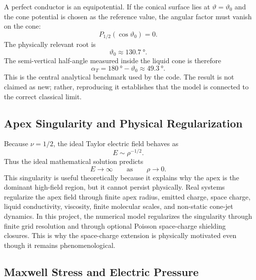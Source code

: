 A perfect conductor is an equipotential. If the conical surface lies at $\vartheta=\vartheta_0$ and the cone potential is chosen as the reference value, the angular factor must vanish on the cone:
\begin{equation}
    P_{1/2}(\cos\vartheta_0)=0.
\label{eq:taylor_root_full}
\end{equation}
The physically relevant root is
\begin{equation}
    \vartheta_0\approx \SI{130.7}{\degree}.
\end{equation}
The semi-vertical half-angle measured inside the liquid cone is therefore
\begin{equation}
    \alpha_T=\SI{180}{\degree}-\vartheta_0\approx \SI{49.3}{\degree}.
\end{equation}
This is the central analytical benchmark used by the code. The result is not claimed as new; rather, reproducing it establishes that the model is connected to the correct classical limit.

\subsection{Apex Singularity and Physical Regularization}

Because $\nu=1/2$, the ideal Taylor electric field behaves as
\begin{equation}
    E\sim \rho^{-1/2}.
\end{equation}
Thus the ideal mathematical solution predicts
\begin{equation}
    E\rightarrow\infty \qquad \text{as}\qquad \rho\rightarrow0.
\end{equation}
This singularity is useful theoretically because it explains why the apex is the dominant high-field region, but it cannot persist physically. Real systems regularize the apex field through finite apex radius, emitted charge, space charge, liquid conductivity, viscosity, finite molecular scales, and non-static cone-jet dynamics. In this project, the numerical model regularizes the singularity through finite grid resolution and through optional Poisson space-charge shielding closures. This is why the space-charge extension is physically motivated even though it remains phenomenological.

\subsection{Maxwell Stress and Electric Pressure}

